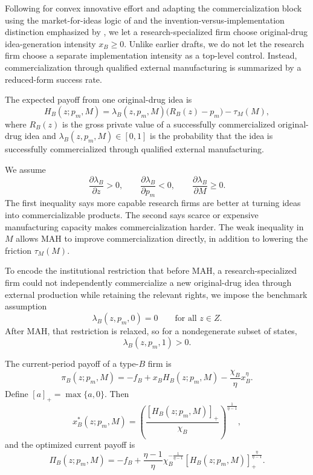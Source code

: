 \documentclass[12pt]{article}
\newcommand{\1}{\mathbf{1}}
\begin{document}
Following \citet{KletteKortum2004} for convex innovative effort and adapting the commercialization block using the market-for-ideas logic of \citet{GansStern2003} and the invention-versus-implementation distinction emphasized by \citet{FonsRosenRoldanBlancoSchmitz2026}, we let a research-specialized firm choose original-drug idea-generation intensity $x_B\ge 0$. Unlike earlier drafts, we do not let the research firm choose a separate implementation intensity as a top-level control. Instead, commercialization through qualified external manufacturing is summarized by a reduced-form success rate.

The expected payoff from one original-drug idea is
\begin{equation}
H_B(z;p_m,M)=\lambda_B(z,p_m,M)\bigl(R_B(z)-p_m\bigr)-\tau_M(M),
\label{eq:HB}
\end{equation}
where $R_B(z)$ is the gross private value of a successfully commercialized original-drug idea and $\lambda_B(z,p_m,M)\in[0,1]$ is the probability that the idea is successfully commercialized through qualified external manufacturing.

We assume
\begin{equation}
\frac{\partial \lambda_B}{\partial z}>0,
\qquad
\frac{\partial \lambda_B}{\partial p_m}<0,
\qquad
\frac{\partial \lambda_B}{\partial M}\ge 0.
\label{eq:lambda_monotone}
\end{equation}
The first inequality says more capable research firms are better at turning ideas into commercializable products. The second says scarce or expensive manufacturing capacity makes commercialization harder. The weak inequality in $M$ allows MAH to improve commercialization directly, in addition to lowering the friction $\tau_M(M)$.

To encode the institutional restriction that before MAH, a research-specialized firm could not independently commercialize a new original-drug idea through external production while retaining the relevant rights, we impose the benchmark assumption
\begin{equation}
\lambda_B(z,p_m,0)=0
\qquad \text{for all } z\in Z.
\label{eq:premah_zero}
\end{equation}
After MAH, that restriction is relaxed, so for a nondegenerate subset of states,
\begin{equation}
\lambda_B(z,p_m,1)>0.
\label{eq:postmah_positive}
\end{equation}

The current-period payoff of a type-$B$ firm is
\begin{equation}
\pi_B(z;p_m,M)
=
-f_B+x_B H_B(z;p_m,M)-\frac{\chi_B}{\eta}x_B^{\eta}.
\label{eq:piB}
\end{equation}
Define $[a]_+=\max\{a,0\}$. Then
\begin{equation}
x_B^*(z;p_m,M)=\left(\frac{[H_B(z;p_m,M)]_+}{\chi_B}\right)^{\frac{1}{\eta-1}},
\label{eq:xB}
\end{equation}
and the optimized current payoff is
\begin{equation}
\Pi_B(z;p_m,M)
=
-f_B+
\frac{\eta-1}{\eta}\chi_B^{-\frac{1}{\eta-1}}[H_B(z;p_m,M)]_+^{\frac{\eta}{\eta-1}}.
\label{eq:PiB}
\end{equation}
\end{document}
